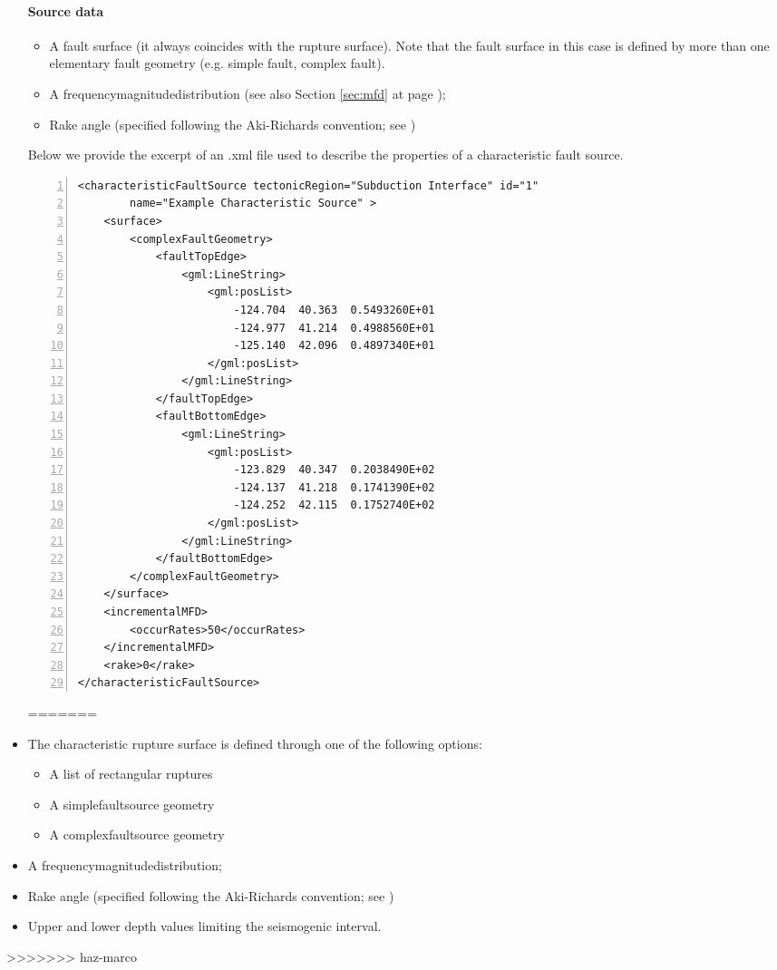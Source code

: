 \begin{itemize}
\paragraph{Source data}
%
\begin{itemize}
<<<<<<< HEAD
\item A fault surface (it always coincides with the rupture surface). 
    Note that the fault surface in this case is defined by more than 
    one elementary fault geometry (e.g. simple fault, complex fault).
\item A \gls{frequencymagnitudedistribution} (see also Section 
    \ref{sec:mfd} at page \pageref{sec:mfd}); 
\item Rake angle (specified following the Aki-Richards convention; 
see \citet{aki2002}) 
\end{itemize}
Below we provide the excerpt of an .xml file used to describe the 
properties of a characteristic fault source. 
\begin{Verbatim}[frame=single, commandchars=\\\{\}, fontsize=\footnotesize,
    numbers=left, numbersep=2pt]
<characteristicFaultSource tectonicRegion="Subduction Interface" id="1" 
        name="Example Characteristic Source" >
    <surface>
        <complexFaultGeometry>
            <faultTopEdge>
                <gml:LineString>
                    <gml:posList>
                        -124.704  40.363  0.5493260E+01
                        -124.977  41.214  0.4988560E+01
                        -125.140  42.096  0.4897340E+01
                    </gml:posList>
                </gml:LineString>
            </faultTopEdge>
            <faultBottomEdge>
                <gml:LineString>
                    <gml:posList>
                        -123.829  40.347  0.2038490E+02
                        -124.137  41.218  0.1741390E+02
                        -124.252  42.115  0.1752740E+02
                    </gml:posList>
                </gml:LineString>
            </faultBottomEdge>
        </complexFaultGeometry>
    </surface>
    <incrementalMFD>
        <occurRates>50</occurRates>
    </incrementalMFD>
    <rake>0</rake>
</characteristicFaultSource>
\end{Verbatim}
=======
\item The characteristic rupture surface is defined through one of the 
	following options:
	\begin{itemize}
		\item A list of rectangular ruptures 
		\item A \gls{simplefaultsource} geometry
		\item A \gls{complexfaultsource} geometry
	\end{itemize}
\item A \gls{frequencymagnitudedistribution};
\item Rake angle (specified following the Aki-Richards convention; 
see \citet{aki2002}) 
\item Upper and lower depth values limiting the seismogenic interval.
\end{itemize}
>>>>>>> haz-marco
